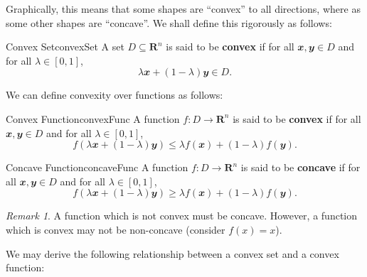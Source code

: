 \documentclass[math, code]{amznotes}
\theoremstyle{remark}
\newtheorem*{remark}{Remark}
\begin{document}
Graphically, this means that some shapes are ``convex'' to all directions, where as some other shapes are ``concave''. We shall define this rigorously as follows:
\begin{dfnbox}{Convex Set}{convexSet}
    A set $D \subseteq \mathbf{R}^n$ is said to be {\color{red} \textbf{convex}} if for all $\mathbfit{x}, \mathbfit{y} \in D$ and for all $\lambda \in [0, 1]$, 
    \begin{displaymath}
        \lambda \mathbfit{x} + (1 - \lambda)\mathbfit{y} \in D.
    \end{displaymath}
\end{dfnbox}
We can define convexity over functions as follows:
\begin{dfnbox}{Convex Function}{convexFunc}
    A function $f \colon D \to \mathbf{R}^n$ is said to be {\color{red} \textbf{convex}} if for all $\mathbfit{x}, \mathbfit{y} \in D$ and for all $\lambda \in [0, 1]$, 
    \begin{displaymath}
        f\left(\lambda \mathbfit{x} + (1 - \lambda)\mathbfit{y}\right) \leq \lambda f(\mathbfit{x}) + (1 - \lambda)f(\mathbfit{y}).
    \end{displaymath}
\end{dfnbox}
\begin{dfnbox}{Concave Function}{concaveFunc}
    A function $f \colon D \to \mathbf{R}^n$ is said to be {\color{red} \textbf{concave}} if for all $\mathbfit{x}, \mathbfit{y} \in D$ and for all $\lambda \in [0, 1]$, 
    \begin{displaymath}
        f\left(\lambda \mathbfit{x} + (1 - \lambda)\mathbfit{y}\right) \geq \lambda f(\mathbfit{x}) + (1 - \lambda)f(\mathbfit{y}).
    \end{displaymath}
\end{dfnbox}
\begin{notebox}
    \begin{remark}
        A function which is not convex must be concave. However, a function which is convex may not be non-concave (consider $f(x) = x$).
    \end{remark}
\end{notebox}
We may derive the following relationship between a convex set and a convex function:
\end{document}
